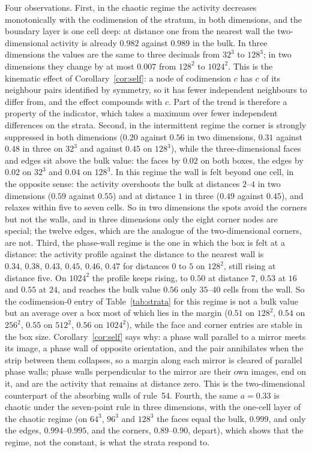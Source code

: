 \documentclass[11pt,a4paper]{article}
\theoremstyle{definition}
\theoremstyle{remark}
\begin{document}
Four observations. First, in the chaotic regime the activity decreases
monotonically with the codimension of the stratum, in both dimensions,
and the boundary layer is one cell deep: at distance one from the
nearest wall the two-dimensional activity is already $0.982$ against
$0.989$ in the bulk. In three dimensions the values are the same to
three decimals from $32^3$ to $128^3$; in two dimensions they change by
at most $0.007$ from $128^2$ to $1024^2$. This is the kinematic effect of
Corollary~\ref{cor:self}: a node of codimension $c$ has $c$ of its
neighbour pairs identified by symmetry, so it has fewer independent
neighbours to differ from, and the effect compounds with $c$. Part of
the trend is therefore a property of the indicator, which takes a
maximum over fewer independent differences on the strata. Second, in the
intermittent regime the corner is strongly suppressed in both
dimensions ($0.20$ against $0.56$ in two dimensions, $0.31$ against
$0.48$ in three on $32^3$ and against $0.45$ on $128^3$), while the
three-dimensional faces and edges sit above the bulk value: the faces
by $0.02$ on both boxes, the edges by $0.02$ on $32^3$ and $0.04$ on
$128^3$.
In this regime the wall is felt beyond one cell, in the opposite sense:
the activity overshoots the bulk at distances $2$--$4$ in two dimensions
($0.59$ against $0.55$) and at distance $1$ in three ($0.49$ against
$0.45$), and relaxes within five to seven cells. So in two dimensions the spots avoid the
corners but not the walls, and in three dimensions only the eight corner
nodes are special; the twelve edges, which are the analogue of the
two-dimensional corners, are not. Third, the phase-wall regime is the
one in which the box is felt at a distance: the activity profile
against the distance to the nearest wall is
$0.34,\,0.38,\,0.43,\,0.45,\,0.46,\,0.47$ for distances $0$ to $5$ on
$128^2$, still rising at distance five. On $1024^2$ the profile keeps
rising, to $0.50$ at distance $7$, $0.53$ at $16$ and $0.55$ at $24$, and
reaches the bulk value $0.56$ only $35$--$40$ cells from the wall. So the
codimension-$0$ entry of Table~\ref{tab:strata} for this regime is not a
bulk value but an average over a box most of which lies in the margin
($0.51$ on $128^2$, $0.54$ on $256^2$, $0.55$ on $512^2$, $0.56$ on
$1024^2$), while the face and corner entries are stable in the box size.
Corollary~\ref{cor:self} says why: a phase wall parallel to a mirror
meets its image, a phase wall of opposite orientation, and the pair
annihilates when the strip between them collapses, so a margin along
each mirror is cleared of parallel phase walls; phase walls
perpendicular to the mirror are their own images, end on it, and are
the activity that remains at distance zero. This is the two-dimensional
counterpart of the absorbing walls of rule~54. Fourth, the same
$a=0.33$ is chaotic under the seven-point rule in three dimensions, with
the one-cell layer of the chaotic regime (on $64^3$, $96^3$ and $128^3$
the faces equal the bulk, $0.999$, and only the edges, $0.994$--$0.995$,
and the corners, $0.89$--$0.90$, depart), which shows that the regime, not the
constant, is what the strata respond to.
\end{document}
